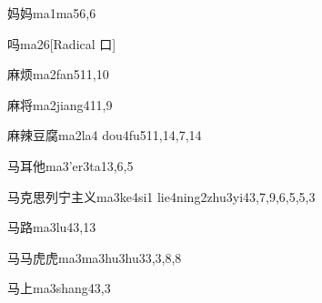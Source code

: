 
\begin{verbete}{妈妈}{ma1ma5}{6,6}
\end{verbete}

\begin{verbete}{吗}{ma2}{6}[Radical 口]
\end{verbete}

\begin{verbete}{麻烦}{ma2fan5}{11,10}
\end{verbete}

\begin{verbete}{麻将}{ma2jiang4}{11,9}
\end{verbete}

\begin{verbete}{麻辣豆腐}{ma2la4 dou4fu5}{11,14,7,14}
\end{verbete}

\begin{verbete}{马耳他}{ma3'er3ta1}{3,6,5}
\end{verbete}

\begin{verbete}{马克思列宁主义}{ma3ke4si1 lie4ning2zhu3yi4}{3,7,9,6,5,5,3}
\end{verbete}

\begin{verbete}{马路}{ma3lu4}{3,13}
\end{verbete}

\begin{verbete}{马马虎虎}{ma3ma3hu3hu3}{3,3,8,8}
\end{verbete}

\begin{verbete}{马上}{ma3shang4}{3,3}
\end{verbete}

